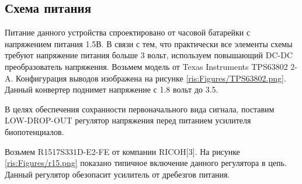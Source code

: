 \begin{sloppypar}
 


\subsection{Схема питания}
Питание данного устройства спроектировано от часовой батарейки с напряжением питания 1.5В. В связи с тем, что практически все элементы схемы требуют напряжение питания больше 3 вольт, используем повышающий DC-DC преобразователь напряжения. Возьмем модель от Texas Instruments TPS63802 2-A\cite{TPS63802}. Конфигурация выводов изображена на рисунке \ref{ris:Figures/TPS63802.png}. Данный конвертер поднимет напряжение с 1.8 вольт до 3.5. 



В целях обеспечения сохранности первоначального вида сигнала, поставим LOW-DROP-OUT регулятор напряжения перед питанием усилителя биопотенциалов. 

Возьмем R1517S331D-E2-FE от компании RICOH[3]. На рисунке \ref{ris:Figures/r15.png} показано типичное включение данного регулятора в цепь. Данный регулятор обезопасит усилитель от дребезгов питания.












\end{sloppypar}
